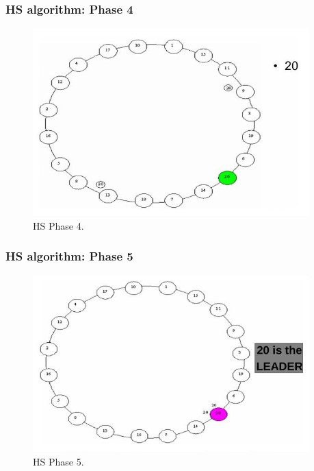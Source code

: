 \documentclass[10pt]{beamer}
\begin{document}
\begin{frame}
  \frametitle{HS algorithm: Phase 4}
  \begin{figure}
    \includegraphics[width=0.95\textwidth]{figs/hs_ex4.png}
    \caption{HS Phase 4. \cite{pedersenLeaderElectionDistributed2022}}
  \end{figure}
\end{frame}

\begin{frame}
  \frametitle{HS algorithm: Phase 5}
  \begin{figure}
    \includegraphics[width=0.95\textwidth]{figs/hs_ex5.png}
    \caption{HS Phase 5. \cite{pedersenLeaderElectionDistributed2022}}
  \end{figure}
\end{frame}
\end{document}
